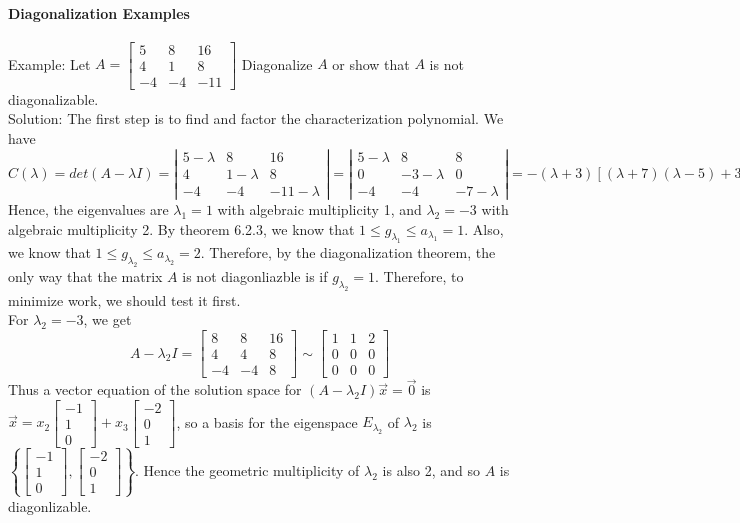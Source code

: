 \documentclass[10pt,letter]{article}
\begin{document}
\paragraph{Diagonalization Examples}  
Example: Let $A=\begin{bmatrix}5&8&16\\4&1&8\\-4&-4&-11\end{bmatrix}$ Diagonalize $A$ or show that $A$ is not diagonalizable. \\ 
Solution: The first step is to find and factor the characterization polynomial. We have $$C(\lambda)=det(A-\lambda I)=\left|\begin{matrix}5-\lambda&8&16\\4&1-\lambda&8\\-4&-4&-11-\lambda\end{matrix}\right|=\left|\begin{matrix}5-\lambda&8&8\\0&-3-\lambda&0\\-4&-4&-7-\lambda\end{matrix}\right|=-(\lambda+3)[(\lambda+7)(\lambda-5)+32]=-(\lambda-1)(\lambda+3)^2$$ Hence, the eigenvalues are $\lambda_1=1$ with algebraic multiplicity 1, and $\lambda_2=-3$ with algebraic multiplicity 2. By theorem 6.2.3, we know that $1\leq g_{\lambda_1}\leq a_{\lambda_1}=1$. Also, we know that $1\leq g_{\lambda_2}\leq a_{\lambda_2}=2$. Therefore, by the diagonalization theorem, the only way that the matrix $A$ is not diagonliazble is if $g_{\lambda_2}=1$. Therefore, to minimize work, we should test it first. \\ 
For $\lambda_2=-3$, we get $$A-\lambda_2 I=\begin{bmatrix}8&8&16\\4&4&8\\-4&-4&8\end{bmatrix}\sim\begin{bmatrix}1&1&2\\0&0&0\\0&0&0\end{bmatrix}$$ Thus a vector equation of the solution space for $(A-\lambda_2I)\vec{x}=\vec{0}$ is $\vec{x}=x_2\begin{bmatrix}-1\\1\\0\end{bmatrix}+x_3\begin{bmatrix}-2\\0\\1\end{bmatrix}$, so a basis for the eigenspace $E_{\lambda_2}$ of $\lambda_2$ is $\left\{\begin{bmatrix}-1\\1\\0\end{bmatrix},\begin{bmatrix}-2\\0\\1\end{bmatrix}\right\}$. Hence the geometric multiplicity of $\lambda_2$ is also 2, and so $A$ is diagonlizable. \\ 
\end{document}
